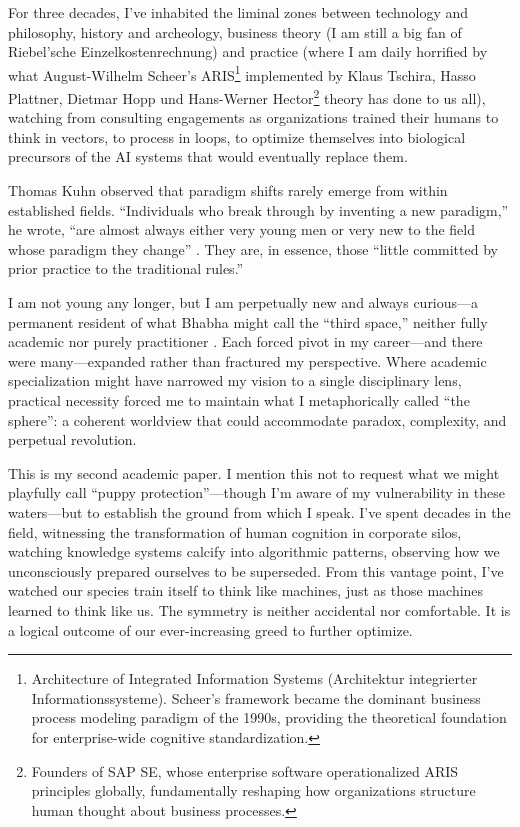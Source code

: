For three decades, I've inhabited the liminal zones between technology and philosophy, history and archeology, business theory (I am still a big fan of Riebel'sche Einzelkostenrechnung) and practice (where I am daily horrified by what August-Wilhelm Scheer's ARIS\footnote{Architecture of Integrated Information Systems (Architektur integrierter Informationssysteme). Scheer's framework became the dominant business process modeling paradigm of the 1990s, providing the theoretical foundation for enterprise-wide cognitive standardization.} implemented by Klaus Tschira, Hasso Plattner, Dietmar Hopp und Hans-Werner Hector\footnote{Founders of SAP SE, whose enterprise software operationalized ARIS principles globally, fundamentally reshaping how organizations structure human thought about business processes.} theory has done to us all), watching from consulting engagements as organizations trained their humans to think in vectors, to process in loops, to optimize themselves into biological precursors of the AI systems that would eventually replace them.

Thomas Kuhn observed that paradigm shifts rarely emerge from within established fields. ``Individuals who break through by inventing a new paradigm,'' he wrote, ``are almost always either very young men or very new to the field whose paradigm they change'' \citep{kuhn1962}. They are, in essence, those ``little committed by prior practice to the traditional rules.''

I am not young any longer, but I am perpetually new and always curious—a permanent resident of what Bhabha might call the ``third space,'' neither fully academic nor purely practitioner \citep{bhabha1994}. Each forced pivot in my career—and there were many—expanded rather than fractured my perspective. Where academic specialization might have narrowed my vision to a single disciplinary lens, practical necessity forced me to maintain what I metaphorically called ``the sphere'': a coherent worldview that could accommodate paradox, complexity, and perpetual revolution.

This is my second academic paper. I mention this not to request what we might playfully call ``puppy protection''—though I'm aware of my vulnerability in these waters—but to establish the ground from which I speak. I've spent decades in the field, witnessing the transformation of human cognition in corporate silos, watching knowledge systems calcify into algorithmic patterns, observing how we unconsciously prepared ourselves to be superseded. From this vantage point, I've watched our species train itself to think like machines, just as those machines learned to think like us. The symmetry is neither accidental nor comfortable. It is a logical outcome of our ever-increasing greed to further optimize.

